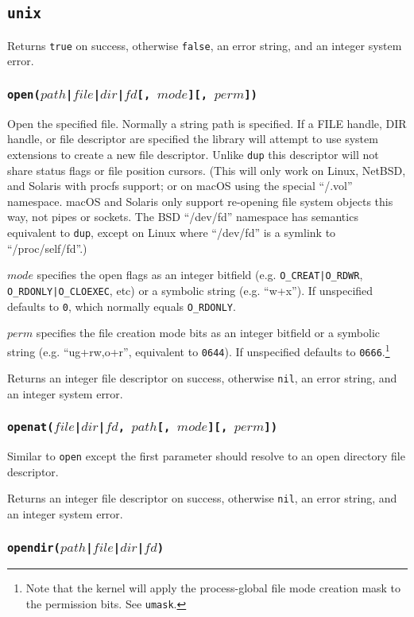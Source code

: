 \documentclass[11pt, oneside]{memoir}
\newcommand*{\true}[0]{\texttt{true}\xspace}
\newcommand*{\false}[0]{\texttt{false}\xspace}
\newcommand*{\nil}[0]{\texttt{nil}\xspace}
\newcommand*{\syscall}[1]{\texttt{#1}\xspace}
\newcommand*{\fn}[1]{\texttt{#1}\xspace}
\newcounter{toccols}
\newenvironment{Module}[1]{
	\subsection{\texttt{#1}}
	\addtocontents{toc}{
		\protect\begin{multicols}{\value{toccols}}
	}
}{
	\addtocontents{toc}{\protect\end{multicols}}
}
\begin{document}
\begin{Module}{unix}
Returns \true on success, otherwise \false, an error string, and an integer system error.

\subsubsection[\fn{open}]{\fn{open($path$|$file$|$dir$|$fd$[, $mode$][, $perm$])}}

Open the specified file. Normally a string path is specified. If a FILE handle, DIR handle, or file descriptor are specified the library will attempt to use system extensions to create a new file descriptor. Unlike \syscall{dup} this descriptor will not share status flags or file position cursors. (This will only work on Linux, NetBSD, and Solaris with procfs support; or on macOS using the special ``/.vol'' namespace. macOS and Solaris only support re-opening file system objects this way, not pipes or sockets. The BSD ``/dev/fd'' namespace has semantics equivalent to \syscall{dup}, except on Linux where ``/dev/fd'' is a symlink to ``/proc/self/fd''.)

$mode$ specifies the open flags as an integer bitfield (e.g. \texttt{O\_CREAT|O\_RDWR}, \texttt{O\_RDONLY|O\_CLOEXEC}, etc) or a symbolic string (e.g. ``w+x''). If unspecified defaults to \texttt{0}, which normally equals \texttt{O\_RDONLY}.

$perm$ specifies the file creation mode bits as an integer bitfield or a symbolic string (e.g. ``ug+rw,o+r'', equivalent to \texttt{0644}). If unspecified defaults to \texttt{0666}.\footnote{Note that the kernel will apply the process-global file mode creation mask to the permission bits. See \syscall{umask}.}

Returns an integer file descriptor on success, otherwise \nil, an error string, and an integer system error.

\subsubsection[\fn{openat}]{\fn{openat($file$|$dir$|$fd$, $path$[, $mode$][, $perm$])}}

Similar to \syscall{open} except the first parameter should resolve to an open directory file descriptor.

Returns an integer file descriptor on success, otherwise \nil, an error string, and an integer system error.

\subsubsection[\fn{opendir}]{\fn{opendir($path$|$file$|$dir$|$fd$)}}


\end{Module}
\end{document}
